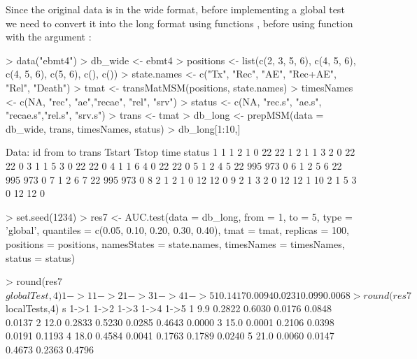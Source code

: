 Since the original data  is in the wide format, before implementing a global test we need to convert it into the long format using functions ,  before using function  with the argument :

\begin{example}
> data("ebmt4")
> db_wide <- ebmt4
> positions <- list(c(2, 3, 5, 6), c(4, 5, 6), c(4, 5, 6),
                 c(5, 6), c(), c())
> state.names <-  c("Tx", "Rec", "AE", "Rec+AE", "Rel",  "Death")
> tmat <- transMatMSM(positions, state.names)
> timesNames <- c(NA, "rec", "ae","recae", "rel", "srv")
> status <- c(NA, "rec.s", "ae.s", "recae.s","rel.s", "srv.s")
> trans <- tmat
> db_long <- prepMSM(data = db_wide, trans, timesNames, status)
> db_long[1:10,]

Data:
   id from to trans Tstart Tstop time status
1   1    1  2     1      0    22   22      1
2   1    1  3     2      0    22   22      0
3   1    1  5     3      0    22   22      0
4   1    1  6     4      0    22   22      0
5   1    2  4     5     22   995  973      0
6   1    2  5     6     22   995  973      0
7   1    2  6     7     22   995  973      0
8   2    1  2     1      0    12   12      0
9   2    1  3     2      0    12   12      1
10  2    1  5     3      0    12   12      0

> set.seed(1234)
> res7 <- AUC.test(data = db_long, from = 1, to = 5, type = 'global',
        quantiles = c(0.05, 0.10, 0.20, 0.30, 0.40),
        tmat = tmat, replicas = 100,
        positions = positions, namesStates = state.names,
        timesNames = timesNames, status = status)
        
        
                  
> round(res7$globalTest, 4)
    1->1    1->2    1->3   1->4    1->5
1  0.1417 0.0094 0.0231 0.099 0.0068

> round(res7$localTests,4)
     s   1->1   1->2   1->3   1->4   1->5
1  9.9 0.2822 0.6030 0.0176 0.0848 0.0137
2 12.0 0.2833 0.5230 0.0285 0.4643 0.0000
3 15.0 0.0001 0.2106 0.0398 0.0191 0.1193
4 18.0 0.4584 0.0041 0.1763 0.1789 0.0240
5 21.0 0.0060 0.0147 0.4673 0.2363 0.4796
\end{example}



